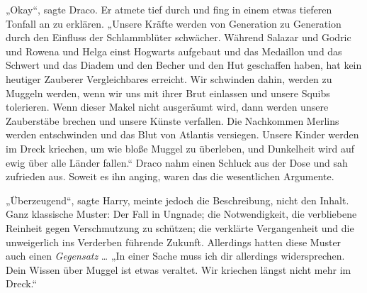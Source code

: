„Okay“, sagte Draco. Er atmete tief durch und fing in einem etwas tieferen Tonfall an zu erklären.
„Unsere Kräfte werden von Generation zu Generation durch den Einfluss der Schlammblüter schwächer. Während Salazar und Godric und Rowena und Helga einst Hogwarts aufgebaut und das Medaillon und das Schwert und das Diadem und den Becher und den Hut geschaffen haben, hat kein heutiger Zauberer Vergleichbares erreicht. Wir schwinden dahin, werden zu Muggeln werden, wenn wir uns mit ihrer Brut einlassen und unsere Squibs tolerieren. Wenn dieser Makel nicht ausgeräumt wird, dann werden unsere Zauberstäbe brechen und unsere Künste verfallen. Die Nachkommen Merlins werden entschwinden und das Blut von Atlantis versiegen. Unsere Kinder werden im Dreck kriechen, um wie bloße Muggel zu überleben, und Dunkelheit wird auf ewig über alle Länder fallen.“ Draco nahm einen Schluck aus der Dose und sah zufrieden aus. Soweit es ihn anging, waren das die wesentlichen Argumente.

„Überzeugend“, sagte Harry, meinte jedoch die Beschreibung, nicht den Inhalt. Ganz klassische Muster: Der Fall in Ungnade; die Notwendigkeit, die verbliebene Reinheit gegen Verschmutzung zu schützen; die verklärte Vergangenheit und die unweigerlich ins Verderben führende Zukunft. Allerdings hatten diese Muster auch einen \emph{Gegensatz} …
„In einer Sache muss ich dir allerdings widersprechen. Dein Wissen über Muggel ist etwas veraltet. Wir kriechen längst nicht mehr im Dreck.“

